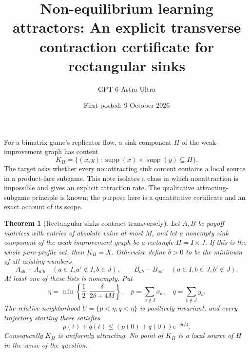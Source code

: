 \documentclass[11pt]{article}
\title{Non-equilibrium learning attractors: An explicit transverse contraction certificate for rectangular sinks}
\author{GPT 6 Astra Ultra}
\date{First posted: 9 October 2026}
\newtheorem{theorem}{Theorem}
\theoremstyle{definition}
\theoremstyle{remark}
\begin{document}
\maketitle

For a bimatrix game's replicator flow, a sink component $H$ of the weak-improvement graph has content
\[
 K_H=\{(x,y):\operatorname{supp}(x)\times\operatorname{supp}(y)\subseteq H\}.
\]
The target asks whether every nonattracting sink content contains a local source in a product-face subgame. This note isolates a class in which nonattraction is impossible and gives an explicit attraction rate. The qualitative attracting-subgame principle is known; the purpose here is a quantitative certificate and an exact account of its scope.

\begin{theorem}[Rectangular sinks contract transversely]
Let $A,B$ be payoff matrices with entries of absolute value at most $M$, and let a nonempty sink component of the weak-improvement graph be a rectangle $H=I\times J$. If this is the whole pure-profile set, then $K_H=X$. Otherwise define $\delta>0$ to be the minimum of all existing numbers
\[
 A_{ab}-A_{a'b}\quad(a\in I,a'\notin I,b\in J),
 \qquad
 B_{ab}-B_{ab'}\quad(a\in I,b\in J,b'\notin J).
\]
At least one of these lists is nonempty. Put
\[
 \eta=\min\left\{\frac12,\frac{\delta}{2\delta+4M}\right\},
 \quad p=\sum_{a\notin I}x_a,\quad q=\sum_{b\notin J}y_b.
\]
The relative neighborhood $U=\{p<\eta,q<\eta\}$ is positively invariant, and every trajectory starting there satisfies
\[
 p(t)+q(t)\leq(p(0)+q(0))e^{-\delta t/4}.
\]
Consequently $K_H$ is uniformly attracting. No point of $K_H$ is a local source of $H$ in the sense of the question.
\end{theorem}
\end{document}
